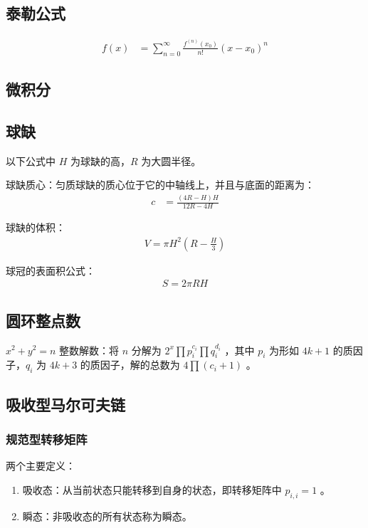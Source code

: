 \documentclass{article}
\begin{document}
\subsection{泰勒公式}
$$
\begin{aligned}
f(x)&=\sum_{n=0}^{\infty}{\frac{f^{(n)}(x_{0})}{n!}}(x-x_0)^n
\end{aligned}
$$
\subsection{微积分}

\subsection{球缺}

以下公式中 $H$ 为球缺的高，$R$ 为大圆半径。

球缺质心：匀质球缺的质心位于它的中轴线上，并且与底面的距离为：
$$
\begin{aligned}
c &= \frac{(4R-H)H}{12R-4H}
\end{aligned}
$$

球缺的体积：
$$
\begin{aligned}
V =\pi H^2(R-\frac{H}{3})
\end{aligned}
$$

球冠的表面积公式：
$$
\begin{aligned}
S =2\pi RH
\end{aligned}
$$

\subsection{圆环整点数}
$x^2+y^2=n$ 整数解数：将 $n$ 分解为 $2^x\prod p_i^{c_i}\prod q_i^{d_i}$ ，其中 $p_i$ 为形如 $4k+1$ 的质因子，$q_i$ 为 $4k+3$ 的质因子，解的总数为 $4\prod (c_i+1)$ 。

\subsection{吸收型马尔可夫链}
\subsubsection{规范型转移矩阵}
两个主要定义：

\begin{enumerate}
    \item 吸收态：从当前状态只能转移到自身的状态，即转移矩阵中 $p_{i,i}=1$ 。
    \item 瞬态：非吸收态的所有状态称为瞬态。
\end{enumerate}
\end{document}
